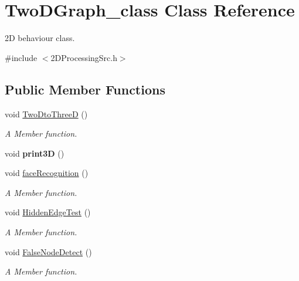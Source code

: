 \hypertarget{classTwoDGraph__class}{}\section{Two\+D\+Graph\+\_\+class Class Reference}
\label{classTwoDGraph__class}


2D behaviour class.  




{\ttfamily \#include $<$2\+D\+Processing\+Src.\+h$>$}

\subsection*{Public Member Functions}
\begin{DoxyCompactItemize}
\item 
void \hyperlink{classTwoDGraph__class_a48222790dda1c34caf1366ce1cc0ce1d}{Two\+Dto\+ThreeD} ()
\begin{DoxyCompactList}\small\item\em A Member function. \end{DoxyCompactList}\item 
void {\bfseries print3D} ()\hypertarget{classTwoDGraph__class_a767c2d4861c0b78aa617e1403fcb65e1}{}\label{classTwoDGraph__class_a767c2d4861c0b78aa617e1403fcb65e1}

\item 
void \hyperlink{classTwoDGraph__class_af0b7cb652fec315e79e0f4826c64ae6d}{face\+Recognition} ()
\begin{DoxyCompactList}\small\item\em A Member function. \end{DoxyCompactList}\item 
void \hyperlink{classTwoDGraph__class_a551441ccdbceddd7c5d7df8c3a0a3e04}{Hidden\+Edge\+Test} ()
\begin{DoxyCompactList}\small\item\em A Member function. \end{DoxyCompactList}\item 
void \hyperlink{classTwoDGraph__class_aac6062b9859be331a44d1fe61036d5a1}{False\+Node\+Detect} ()
\begin{DoxyCompactList}\small\item\em A Member function. \end{DoxyCompactList}\end{DoxyCompactItemize}
